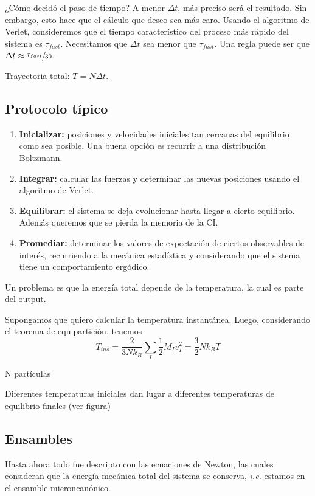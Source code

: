   ¿Cómo decidó el paso de tiempo? A menor $\Delta t$, más preciso será el resultado. Sin embargo, esto hace que el cálculo que deseo sea más caro. Usando el algoritmo de Verlet, consideremos que el tiempo característico del proceso más rápido del sistema es $\tau_{fast}$. Necesitamos que $\Delta t$ sea menor que $\tau_{fast}$. Una regla puede ser que $\Delta t \approx \sfrac{\tau_{fast}}{30}$.

  Trayectoria total: $T = N \Delta t$.

\subsection{Protocolo típico}

  \begin{enumerate}
    \item \textbf{Inicializar:} posiciones y velocidades iniciales tan cercanas del equilibrio como sea posible. Una buena opción es recurrir a una distribución Boltzmann.
    \item \textbf{Integrar:} calcular las fuerzas y determinar las nuevas posiciones usando el algoritmo de Verlet.
    \item \textbf{Equilibrar:} el sistema se deja evolucionar hasta llegar a cierto equilibrio. Además queremos que se pierda la memoria de la CI.
    \item \textbf{Promediar:} determinar los valores de expectación de ciertos observables de interés, recurriendo a la mecánica estadística y considerando que el sistema tiene un comportamiento ergódico.
  \end{enumerate}

  Un problema es que la energía total depende de la temperatura, la cual es parte del output.

  Supongamos que quiero calcular la temperatura instantánea. Luego, considerando el teorema de equipartición, tenemos
    $$T_{ins} = \frac{2}{3N k_B} \sum_I \frac{1}{2} M_I v_I^2 = \frac{3}{2} N k_B T$$

  N partículas

  Diferentes temperaturas iniciales dan lugar a diferentes temperaturas de equilibrio finales (ver figura)

\subsection{Ensambles}

  Hasta ahora todo fue descripto con las ecuaciones de Newton, las cuales consideran que la energía mecánica total del sistema se conserva, \emph{i.e.} estamos en el ensamble microncanónico.

